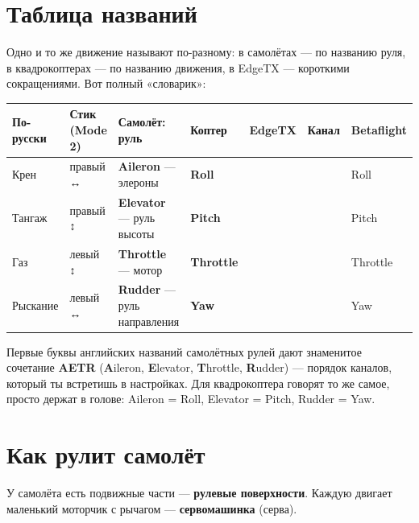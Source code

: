 \section{Таблица названий}

Одно и то же движение называют по-разному: в самолётах --- по названию руля, в квадрокоптерах ---
по названию движения, в EdgeTX --- короткими сокращениями. Вот полный «словарик»:

\begin{center}\small
\renewcommand{\arraystretch}{1.35}
\begin{tabularx}{\linewidth}{@{}L{18mm}L{16mm}YL{15mm}L{13mm}L{11mm}L{16mm}@{}}
\toprule
\textbf{По-русски} & \textbf{Стик (Mode 2)} & \textbf{Самолёт: руль} & \textbf{Коптер} & \textbf{EdgeTX} & \textbf{Канал} & \textbf{Betaflight} \\
\midrule
Крен & правый ↔ & \textbf{Aileron} --- элероны & \textbf{Roll} &  &  & Roll \\
Тангаж & правый ↕ & \textbf{Elevator} --- руль высоты & \textbf{Pitch} &  &  & Pitch \\
Газ & левый ↕ & \textbf{Throttle} --- мотор & \textbf{Throttle} &  &  & Throttle \\
Рыскание & левый ↔ & \textbf{Rudder} --- руль направления & \textbf{Yaw} &  &  & Yaw \\
\bottomrule
\end{tabularx}
\end{center}

Первые буквы английских названий самолётных рулей дают знаменитое сочетание
\textbf{AETR} (\textbf{A}ileron, \textbf{E}levator, \textbf{T}hrottle, \textbf{R}udder) ---
порядок каналов, который ты встретишь в настройках. Для квадрокоптера говорят
то же самое, просто держат в голове: Aileron = Roll, Elevator = Pitch, Rudder = Yaw.

\section{Как рулит самолёт}

У самолёта есть подвижные части --- \textbf{рулевые поверхности}. Каждую двигает маленький
моторчик с рычагом --- \textbf{сервомашинка} (серва).


